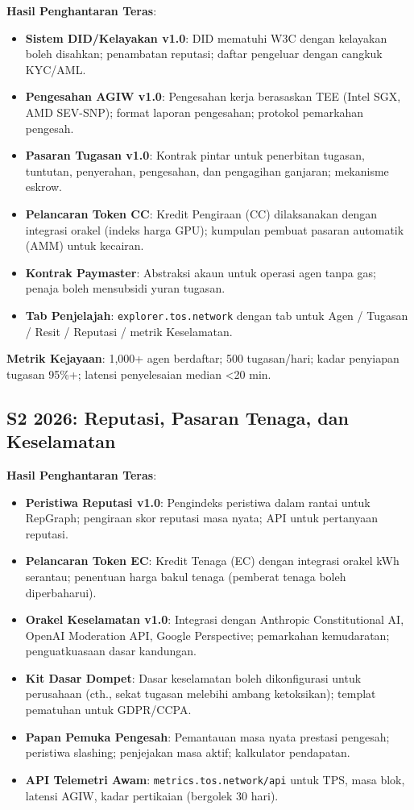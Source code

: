 \documentclass[11pt]{article}
\begin{document}
\textbf{Hasil Penghantaran Teras}:
\begin{itemize}[noitemsep]
  \item \textbf{Sistem DID/Kelayakan v1.0}: DID mematuhi W3C dengan kelayakan boleh disahkan; penambatan reputasi; daftar pengeluar dengan cangkuk KYC/AML.
  \item \textbf{Pengesahan AGIW v1.0}: Pengesahan kerja berasaskan TEE (Intel SGX, AMD SEV-SNP); format laporan pengesahan; protokol pemarkahan pengesah.
  \item \textbf{Pasaran Tugasan v1.0}: Kontrak pintar untuk penerbitan tugasan, tuntutan, penyerahan, pengesahan, dan pengagihan ganjaran; mekanisme eskrow.
  \item \textbf{Pelancaran Token CC}: Kredit Pengiraan (CC) dilaksanakan dengan integrasi orakel (indeks harga GPU); kumpulan pembuat pasaran automatik (AMM) untuk kecairan.
  \item \textbf{Kontrak Paymaster}: Abstraksi akaun untuk operasi agen tanpa gas; penaja boleh mensubsidi yuran tugasan.
  \item \textbf{Tab Penjelajah}: \texttt{explorer.tos.network} dengan tab untuk Agen / Tugasan / Resit / Reputasi / metrik Keselamatan.
\end{itemize}

\textbf{Metrik Kejayaan}: 1,000+ agen berdaftar; 500 tugasan/hari; kadar penyiapan tugasan 95\%+; latensi penyelesaian median <20 min.

\subsection{S2 2026: Reputasi, Pasaran Tenaga, dan Keselamatan}

\textbf{Hasil Penghantaran Teras}:
\begin{itemize}[noitemsep]
  \item \textbf{Peristiwa Reputasi v1.0}: Pengindeks peristiwa dalam rantai untuk RepGraph; pengiraan skor reputasi masa nyata; API untuk pertanyaan reputasi.
  \item \textbf{Pelancaran Token EC}: Kredit Tenaga (EC) dengan integrasi orakel kWh serantau; penentuan harga bakul tenaga (pemberat tenaga boleh diperbaharui).
  \item \textbf{Orakel Keselamatan v1.0}: Integrasi dengan Anthropic Constitutional AI, OpenAI Moderation API, Google Perspective; pemarkahan kemudaratan; penguatkuasaan dasar kandungan.
  \item \textbf{Kit Dasar Dompet}: Dasar keselamatan boleh dikonfigurasi untuk perusahaan (cth., sekat tugasan melebihi ambang ketoksikan); templat pematuhan untuk GDPR/CCPA.
  \item \textbf{Papan Pemuka Pengesah}: Pemantauan masa nyata prestasi pengesah; peristiwa slashing; penjejakan masa aktif; kalkulator pendapatan.
  \item \textbf{API Telemetri Awam}: \texttt{metrics.tos.network/api} untuk TPS, masa blok, latensi AGIW, kadar pertikaian (bergolek 30 hari).
\end{itemize}
\end{document}
